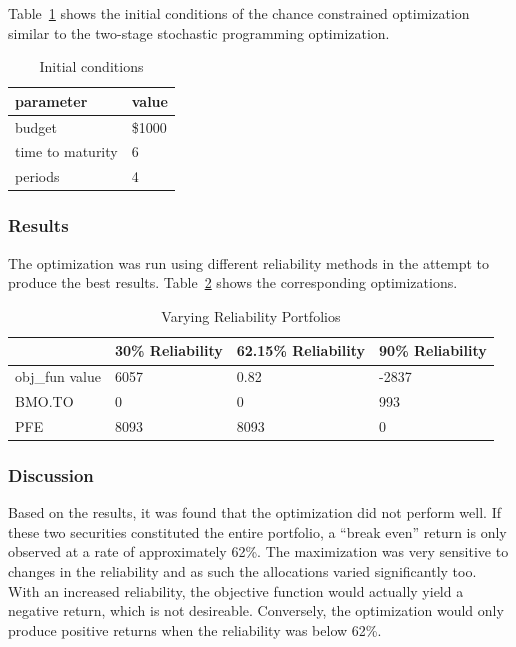 \documentclass[12pt]{article}
\begin{document}
Table~\ref{tab:init_cond2} shows the initial conditions of the chance constrained optimization similar to the two-stage stochastic programming optimization.

\begin{table}[H]
	\centering
\begin{tabular}{|l|l|}
\hline
	\textbf{parameter} & \textbf{value} \\ \hline
	budget & \$1000 \\ \hline
	time to maturity & 6\\ \hline
	periods & 4 \\ \hline
\end{tabular}
\caption {Initial conditions}
\label{tab:init_cond2}
\end{table}

\subsubsection{Results}
The optimization was run using different reliability methods in the attempt to produce the best results. Table~\ref{tab:result_cc} shows the corresponding optimizations. 

\begin{table}[H]
\centering
\begin{tabular}{|l|l|l|l|}
\hline
	~ & \textbf{30\% Reliability} & \textbf{62.15\% Reliability} & \textbf{90\% Reliability} \\ \hline
	obj\_fun value & 6057 & 0.82 & -2837 \\ \hline
	BMO.TO & 0 & 0 & 993 \\ \hline
	PFE & 8093 & 8093 & 0\\ \hline
\end{tabular}
\caption {Varying Reliability Portfolios}
\label{tab:result_cc}
\end{table}

\subsubsection{Discussion}
Based on the results, it was found that the optimization did not perform well. If these two securities constituted the entire portfolio, a ``break even'' return is only observed at a rate of approximately 62\%. The maximization was very sensitive to changes in the reliability and as such the allocations varied significantly too. With an increased reliability, the objective function would actually yield a negative return, which is not desireable. Conversely, the optimization would only produce positive returns when the reliability was below 62\%. 
\end{document}
